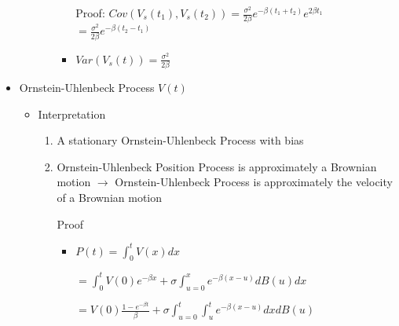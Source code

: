 \documentclass[a4paper]{article}
\begin{document}
\begin{itemize}
\begin{itemize}
\begin{itemize}
\begin{itemize}
                                Proof: $\mathit{Cov}(V_s(t_1), V_s(t_2)) = \frac{\sigma^2}{2\beta} e^{-\beta(t_1 + t_2)} e^{2\beta t_1}$
                                $= \frac{\sigma^2}{2\beta} e^{-\beta(t_2 - t_1)}$
                            \item $\mathit{Var}(V_s(t)) = \frac{\sigma^2}{2\beta}$
                        \end{itemize}
                \end{itemize}
        \end{itemize}
    \item Ornstein-Uhlenbeck Process $V(t)$
        \begin{itemize}
            \item Interpretation
                \begin{enumerate}
                    \item A stationary Ornstein-Uhlenbeck Process with bias
                    \item Ornstein-Uhlenbeck Position Process is approximately a Brownian motion $\rightarrow$ Ornstein-Uhlenbeck Process is approximately the velocity of a Brownian motion

                        Proof
                        \begin{itemize}
                            \item $P(t) = \int_0^t V(x) dx$

                                $= \int_0^t V(0) e^{-\beta x} + \sigma \int_{u=0}^x e^{-\beta (x-u)} d B(u) dx$

                                $= V(0) \frac{1 - e^{-\beta t}}{\beta} + \sigma \int_{u=0}^t \int_u^t e^{-\beta (x-u)} d x d B(u)$


\end{itemize}
\end{enumerate}
\end{itemize}
\end{itemize}
\end{document}
